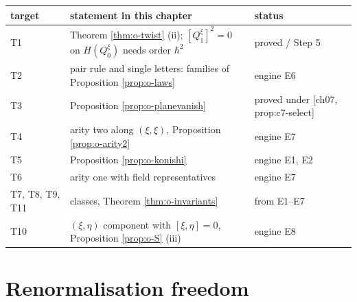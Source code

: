 \begin{tabular}{l|l|l}
target & statement in this chapter & status \\
\hline
T1 & Theorem \ref{thm:o-twist} (ii); $[Q_1^\xi]^2=0$ on $H(Q_0^\xi)$ needs order $\hbar^2$ & proved / Step 5 \\
T2 & pair rule and single letters: families of Proposition \ref{prop:o-laws} & engine E6 \\
T3 & Proposition \ref{prop:o-planevanish} & proved under [ch07, prop:c7-select] \\
T4 & arity two along $(\xi,\xi)$, Proposition \ref{prop:o-arity2} & engine E7 \\
T5 & Proposition \ref{prop:o-konishi} & engine E1, E2 \\
T6 & arity one with field representatives & engine E7 \\
T7, T8, T9, T11 & classes, Theorem \ref{thm:o-invariants} & from E1--E7 \\
T10 & $(\xi,\eta)$ component with $[\xi,\eta]=0$, Proposition \ref{prop:o-S} (iii) & engine E8 \\
\end{tabular}

\section{Renormalisation freedom}

